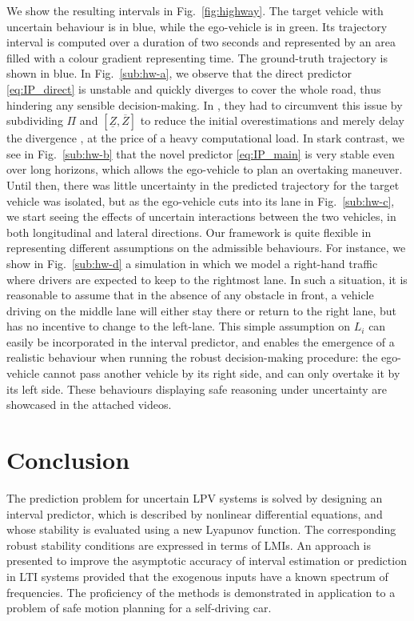 \documentclass[twocolumn,english]{IEEEtran}
\theoremstyle{plain}
\theoremstyle{definition}
\theoremstyle{plain}
\theoremstyle{plain}
\theoremstyle{remark}
\begin{document}
We show the resulting intervals in Fig.~\ref{fig:highway}. The target vehicle with uncertain behaviour is in blue, while the ego-vehicle is in green. Its trajectory interval is computed over a duration of two seconds and represented by an area filled with a colour gradient representing time. The ground-truth trajectory is shown in blue. In Fig.~\ref{sub:hw-a}, we observe that the direct predictor \eqref{eq:IP_direct} is unstable and quickly diverges to cover the whole road, thus hindering any sensible decision-making. In \cite{Leurent2018}, they had to circumvent this issue by subdividing $\Pi$ and $[\underline{Z}, \overline{Z}]$ to reduce the initial overestimations and merely delay the divergence \cite{Adrot2003}, at the price of a heavy computational load. In stark contrast, we see in Fig.~\ref{sub:hw-b} that the novel predictor \eqref{eq:IP_main} is very stable even over long horizons, which allows the ego-vehicle to plan an overtaking maneuver. Until then, there was little uncertainty in the predicted trajectory for the target vehicle was isolated, but as the ego-vehicle cuts into its lane in Fig.~\ref{sub:hw-c}, we start seeing the  effects of uncertain interactions between the two vehicles, in both longitudinal and lateral directions. Our framework is quite flexible in representing different assumptions on the admissible behaviours. For instance, we show in Fig.~\ref{sub:hw-d} a simulation in which we model a right-hand traffic where drivers are expected to keep to the rightmost lane. In such a situation, it is reasonable to assume that in the absence of any obstacle in front, a vehicle driving on the middle lane will either stay there or return to the right lane, but has no incentive to change to the left-lane. This simple assumption on $L_i$ can easily be incorporated in the interval predictor, and enables the emergence of a realistic behaviour when running the robust decision-making procedure: the ego-vehicle cannot pass another vehicle by its right side, and can only overtake it by its left side. These behaviours displaying safe reasoning under uncertainty are showcased in the attached videos.

\section{Conclusion}

The prediction problem for uncertain LPV systems is solved by designing an interval predictor, which is described by nonlinear differential equations, and whose stability is evaluated using a new Lyapunov function. The corresponding robust stability conditions are expressed in terms of LMIs. An approach is presented to improve the asymptotic accuracy of interval estimation or prediction in LTI systems provided that the exogenous inputs have a known spectrum of frequencies. The proficiency of the methods is demonstrated in application to a problem of safe motion planning for a self-driving car.



\end{document}
